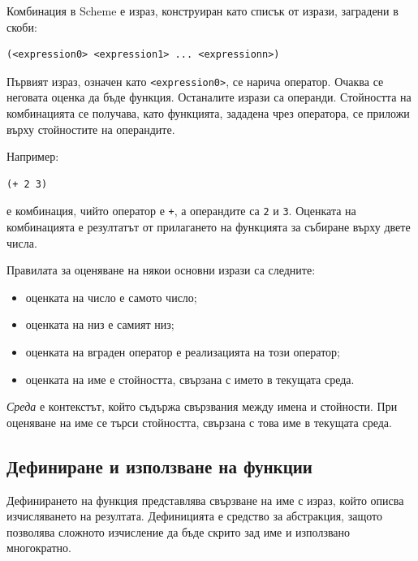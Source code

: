 Комбинация в Scheme е израз, конструиран като списък от изрази, заградени в скоби:

\begin{verbatim}
(<expression0> <expression1> ... <expressionn>)
\end{verbatim}

\begin{defn}
Първият израз, означен като \texttt{<expression0>}, се нарича оператор. Очаква се неговата оценка да бъде функция. Останалите изрази са операнди. Стойността на комбинацията се получава, като функцията, зададена чрез оператора, се приложи върху стойностите на операндите.
\end{defn}

Например:

\begin{verbatim}
(+ 2 3)
\end{verbatim}

е комбинация, чийто оператор е \texttt{+}, а операндите са \texttt{2} и \texttt{3}. Оценката на комбинацията е резултатът от прилагането на функцията за събиране върху двете числа.

Правилата за оценяване на някои основни изрази са следните:

\begin{itemize}
    \item оценката на число е самото число;
    \item оценката на низ е самият низ;
    \item оценката на вграден оператор е реализацията на този оператор;
    \item оценката на име е стойността, свързана с името в текущата среда.
\end{itemize}

\begin{defn}
\emph{Среда} е контекстът, който съдържа свързвания между имена и стойности. При оценяване на име се търси стойността, свързана с това име в текущата среда.
\end{defn}

\subsection{Дефиниране и използване на функции}\label{s:19.1.3}

\begin{defn}
Дефинирането на функция представлява свързване на име с израз, който описва изчисляването на резултата. Дефиницията е средство за абстракция, защото позволява сложното изчисление да бъде скрито зад име и използвано многократно.
\end{defn}

